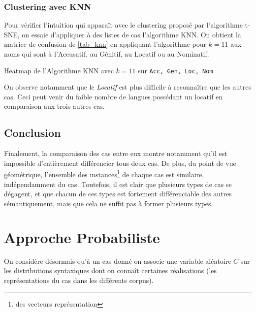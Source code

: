 \documentclass{cours}
\begin{document}
\subsubsection{Clustering avec KNN}\label{subsub:knn}
Pour vérifier l'intuition qui apparaît avec le clustering proposé par l'algorithme t-SNE, on essaie d'appliquer à des listes de cas l'algorithme KNN.
On obtient la matrice de confusion de \ref{tab_knn} en appliquant l'algorithme pour $k = 11$ aux noms qui sont à l'Accusatif, au Génitif, au Locatif ou au Nominatif.
\begin{table}
	\centering
	\pgfplotsset{colormap/jet}
	\caption{Heatmap de l'Algorithme KNN avec $k = 11$ sur \texttt{Acc, Gen, Loc, Nom}}
	\label{tab_knn}
\end{table}

On observe notamment que le \emph{Locatif} est plus difficile à reconnaître que les autres cas. Ceci peut venir du faible nombre de langues possédant un locatif en comparaison aux trois autres cas.

\subsection{Conclusion}
Finalement, la comparaison des cas entre eux montre notamment qu'il est impossible d'entièrement différencier tous deux cas.
De plus, du point de vue géométrique, l'ensemble des instances\footnote{des vecteurs représentation} de chaque cas est similaire, indépendamment du cas.
Toutefois, il est clair que plusieurs types de cas se dégagent, et que chacun de ces types est fortement différenciable des autres sémantiquement, mais que cela ne suffit pas à former plusieurs types.

\section{Approche Probabiliste}\label{sec:probas}
On considère désormais qu'à un cas donné on associe une variable aléatoire $C$ sur les distributions syntaxiques dont on connaît certaines réalisations (les représentations du cas dans les différents corpus).
\end{document}

